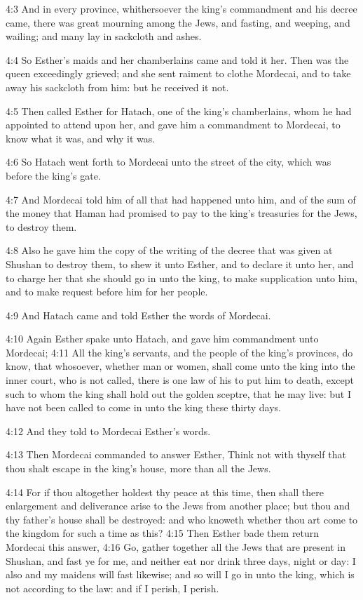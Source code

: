 4:3 And in every province, whithersoever the king's commandment and his decree came, there was great mourning among the Jews, and fasting, and weeping, and wailing; and many lay in sackcloth and ashes.

4:4 So Esther's maids and her chamberlains came and told it her. Then was the queen exceedingly grieved; and she sent raiment to clothe Mordecai, and to take away his sackcloth from him: but he received it not.

4:5 Then called Esther for Hatach, one of the king's chamberlains, whom he had appointed to attend upon her, and gave him a commandment to Mordecai, to know what it was, and why it was.

4:6 So Hatach went forth to Mordecai unto the street of the city, which was before the king's gate.

4:7 And Mordecai told him of all that had happened unto him, and of the sum of the money that Haman had promised to pay to the king's treasuries for the Jews, to destroy them.

4:8 Also he gave him the copy of the writing of the decree that was given at Shushan to destroy them, to shew it unto Esther, and to declare it unto her, and to charge her that she should go in unto the king, to make supplication unto him, and to make request before him for her people.

4:9 And Hatach came and told Esther the words of Mordecai.

4:10 Again Esther spake unto Hatach, and gave him commandment unto Mordecai; 4:11 All the king's servants, and the people of the king's provinces, do know, that whosoever, whether man or women, shall come unto the king into the inner court, who is not called, there is one law of his to put him to death, except such to whom the king shall hold out the golden sceptre, that he may live: but I have not been called to come in unto the king these thirty days.

4:12 And they told to Mordecai Esther's words.

4:13 Then Mordecai commanded to answer Esther, Think not with thyself that thou shalt escape in the king's house, more than all the Jews.

4:14 For if thou altogether holdest thy peace at this time, then shall there enlargement and deliverance arise to the Jews from another place; but thou and thy father's house shall be destroyed: and who knoweth whether thou art come to the kingdom for such a time as this?  4:15 Then Esther bade them return Mordecai this answer, 4:16 Go, gather together all the Jews that are present in Shushan, and fast ye for me, and neither eat nor drink three days, night or day: I also and my maidens will fast likewise; and so will I go in unto the king, which is not according to the law: and if I perish, I perish.


